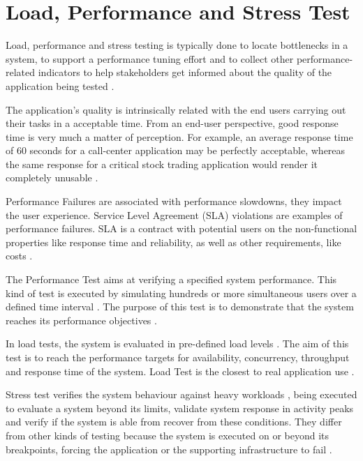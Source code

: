 \section{Load, Performance and Stress Test}

Load, performance and stress testing is typically done to locate bottlenecks in a system, to support a performance tuning effort and to collect other performance-related indicators to help stakeholders get informed about the quality of the application being tested \cite{Sandler2004} \cite{Corporation2007}. 


The application's quality is intrinsically related with the end users carrying out their tasks in a acceptable time. From an end-user perspective, good response time is very much a matter of perception. For example, an average response time of 60 seconds for a call-center application may be perfectly acceptable, whereas the same response for a critical stock trading application would render it completely unusable \cite{Molyneaux2009}.

Performance Failures are associated with performance slowdowns, they impact the user experience. Service Level Agreement (SLA) violations are examples of performance failures. SLA is a contract with potential users on the non-functional properties like response time and reliability, as well as other requirements, like costs \cite{bernard2012foundations} \cite{Jiang2010}.

The Performance Test aims at verifying a specified system performance. This kind of test is executed by simulating hundreds or more simultaneous users  over a defined time interval \cite{DiLucca2006}. The purpose of this test is to demonstrate that the system  reaches its performance objectives \cite{Sandler2004}. 


In load tests, the system is evaluated in pre-defined load levels \cite{DiLucca2006}. The aim of this test is to reach the performance targets for availability, concurrency, throughput and response time of the system. Load Test is the closest to real application use \cite{Molyneaux2009}.

Stress test verifies the system behaviour against heavy workloads \cite{Sandler2004}, being executed to evaluate a system beyond its limits, validate system response in activity peaks and verify if the system is able from recover from these conditions. They differ from other kinds of testing  because the system is executed on or beyond its breakpoints, forcing the application or the supporting infrastructure to fail \cite{DiLucca2006} \cite{Molyneaux2009}.

